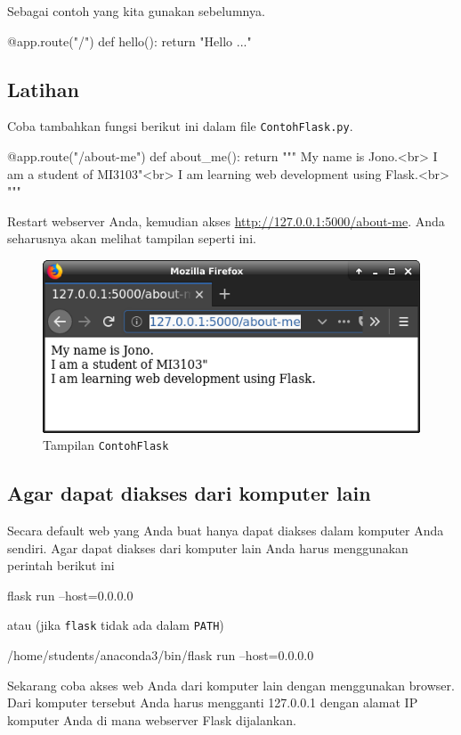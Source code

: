 \documentclass[a4paper,11pt]{extarticle}
\begin{document}
Sebagai contoh yang kita gunakan sebelumnya.
\begin{pythoncode}
@app.route("/")
def hello():
    return "Hello ..."
\end{pythoncode}

\subsection{Latihan}
Coba tambahkan fungsi berikut ini dalam file \texttt{ContohFlask.py}.
\begin{pythoncode}
@app.route("/about-me")
def about_me():
    return """
    My name is Jono.<br>
    I am a student of MI3103"<br>
    I am learning web development using Flask.<br>
    """
\end{pythoncode}

Restart webserver Anda, kemudian akses \url{http://127.0.0.1:5000/about-me}.
Anda seharusnya akan melihat tampilan seperti ini.
\begin{figure}[h!]
{\centering
\includegraphics[scale=0.5]{images/Firefox_Hello_v2.png}
\par}
\caption{Tampilan \texttt{ContohFlask}}
\end{figure}

\subsection{Agar dapat diakses dari komputer lain}

Secara default web yang Anda buat hanya dapat diakses dalam komputer Anda sendiri.
Agar dapat diakses dari komputer lain Anda harus menggunakan perintah berikut ini
\begin{textcode}
flask run --host=0.0.0.0
\end{textcode}
atau (jika \texttt{flask} tidak ada dalam \texttt{PATH})
\begin{textcode}
/home/students/anaconda3/bin/flask run --host=0.0.0.0
\end{textcode}

Sekarang coba akses web Anda dari komputer lain dengan menggunakan browser.
Dari komputer tersebut Anda harus mengganti 127.0.0.1 dengan alamat IP komputer
Anda di mana webserver Flask dijalankan.
\end{document}
